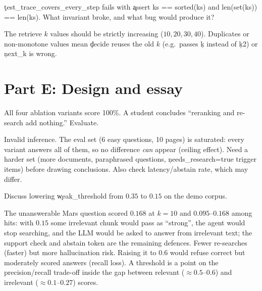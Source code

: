 \begin{problem}
\c{test\_trace\_covers\_every\_step} fails with \c{assert ks == sorted(ks) and len(set(ks)) == len(ks)}. What invariant broke, and what bug would produce it?
\end{problem}
\begin{solution}
The retrieve $k$ values should be strictly increasing ($10,20,30,40$). Duplicates or non-monotone values mean \c{decide} reuses the old $k$ (e.g.\ passes \c{k} instead of \c{k2}) or \c{next\_k} is wrong.
\end{solution}

\section*{Part E: Design and essay}
\begin{problem}
All four ablation variants score 100\%. A student concludes ``reranking and re-search add nothing.'' Evaluate.
\end{problem}
\begin{solution}
Invalid inference. The eval set (6 easy questions, 10 pages) is saturated: every variant answers all of them, so no difference \emph{can} appear (ceiling effect). Need a harder set (more documents, paraphrased questions, \c{needs\_research=true} trigger items) before drawing conclusions. Also check latency/abstain rate, which may differ.
\end{solution}

\begin{problem}
Discuss lowering \c{weak\_threshold} from $0.35$ to $0.15$ on the demo corpus.
\end{problem}
\begin{solution}
The unanswerable Mars question scored $0.168$ at $k=10$ and $0.095$--$0.168$ among hits: with $0.15$ some irrelevant chunk would pass as ``strong'', the agent would stop searching, and the LLM would be asked to answer from irrelevant text; the support check and abstain token are the remaining defences. Fewer re-searches (faster) but more hallucination risk. Raising it to $0.6$ would refuse correct but moderately scored answers (recall loss). A threshold is a point on the precision/recall trade-off inside the gap between relevant ($\approx0.5$--$0.6$) and irrelevant ($\approx0.1$--$0.27$) scores.
\end{solution}

